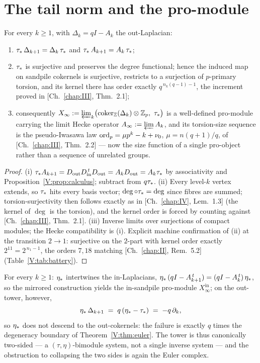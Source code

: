 \section{The tail norm and the pro-module}\label{V:sec:norm}

\begin{theorem}\label{V:thm:norm}
For every $k\ge1$, with $\Delta_k=qI-A_k$ the out-Laplacian:
\begin{enumerate}
\item[(i)] $\tau_*\,\Delta_{k+1}=\Delta_k\,\tau_*$ and $\tau_*\,A_{k+1}=A_k\,\tau_*$;
\item[(ii)] $\tau_*$ is surjective and preserves the degree functional; hence the
induced map on sandpile cokernels is surjective, restricts to a surjection of
$p$-primary torsion, and its kernel there has order exactly
$q^{\,n_k(q-1)-1}$, the increment proved in {\rm[Ch.~\ref{chap:III}, Thm.~2.1]};
\item[(iii)] consequently
$X_\infty:=\varprojlim_k\bigl(\coker_\Z(\Delta_k)\otimes\Zp,\ \ta\bigr)$
is a well-defined pro-module carrying the limit Hecke operator
$A_\infty:=\varprojlim A_k$, and its torsion-size sequence is the pseudo-Iwasawa law
$\operatorname{ord}_p=\mu p^k-k+\nu_0$, $\mu=n(q+1)/q$, of {\rm[Ch.~\ref{chap:III}, Thm.~2.2]} --- now the size
function of a single pro-object rather than a sequence of unrelated groups.
\end{enumerate}
\end{theorem}

\begin{proof}
(i) $\tau_* A_{k+1}=D_{\mathrm{out}}D_{\mathrm{in}}^{\,t}D_{\mathrm{out}}
=A_kD_{\mathrm{out}}=A_k\tau_*$ by associativity and
Proposition~\ref{V:prop:calculus}; subtract from $q\tau_*$. (ii) Every level-$k$ vertex
extends, so $\tau_*$ hits every basis vector; $\deg\circ\tau_*=\deg$ since fibres are
summed; torsion-surjectivity then follows exactly as in [Ch.~\ref{chap:IV}, Lem.~1.3] (the kernel of
$\deg$ is the torsion), and the kernel order is forced by counting against
[Ch.~\ref{chap:III}, Thm.~2.1]. (iii) Inverse limits over surjections of compact modules; the Hecke
compatibility is (i). Explicit machine confirmation of (ii) at the transition
$2\to1$: surjective on the $2$-part with kernel order exactly $2^{11}=2^{\,n_1-1}$,
the orders $7,18$ matching [Ch.~\ref{chap:II}, Rem.~5.2] (Table~\ref{V:tab:battery}).
\end{proof}

\begin{proposition}\label{V:prop:mirror}
For every $k\ge1$: $\eta_*$ intertwines the in-Laplacians,
$\eta_*\,(qI-A_{k+1}^{\,t})=(qI-A_k^{\,t})\,\eta_*$, so the mirrored construction yields the
in-sandpile pro-module $X_\infty^{\mathrm{in}}$; on the out-tower, however,
\[
\eta_*\,\Delta_{k+1}\;=\;q\,(\eta_*-\tau_*)\;=\;-q\,\partial_k ,
\]
so $\eta_*$ does not descend to the out-cokernels: the failure is exactly $q$ times the
degeneracy boundary of Theorem~\ref{V:thm:euler}. The tower is thus canonically
two-sided --- a $(\tau,\eta)$-bimodule system, not a single inverse system --- and
the obstruction to collapsing the two sides is again the Euler complex.
\end{proposition}

